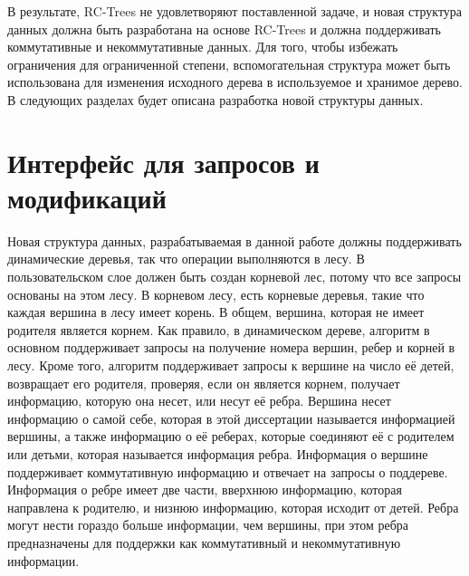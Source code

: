 \documentclass[specification,annotation]{itmo-student-thesis}
\begin{document}
В результате, RC-Trees не удовлетворяют поставленной задаче, и новая структура данных должна быть разработана на основе RC-Trees и должна поддерживать коммутативные и некоммутативные данных. Для того, чтобы избежать 
ограничения для ограниченной степени, вспомогательная структура может быть использована для изменения исходного дерева в используемое и хранимое дерево. В следующих разделах будет описана разработка новой структуры данных.


\section{Интерфейс для запросов и модификаций}


Новая структура данных, разрабатываемая в данной работе должны поддерживать динамические деревья, так что операции выполняются в лесу. В пользовательском слое  должен быть создан корневой лес, потому что все запросы основаны на этом лесу. В корневом лесу, есть корневые деревья, такие что каждая вершина в лесу имеет корень. В общем, вершина, которая не имеет родителя является корнем. Как правило, в динамическом 
дереве, алгоритм в основном поддерживает запросы на получение номера вершин, ребер и корней в лесу. Кроме того, алгоритм поддерживает запросы к вершине на число её детей, возвращает его родителя, проверяя, если он является корнем, получает информацию, которую она несет, или несут её ребра. 
Вершина несет информацию о самой себе, которая в этой диссертации называется информацией вершины, а 
также информацию о её реберах, которые соединяют её с родителем или детьми, которая называется информация ребра. Информация о вершине поддерживает коммутативную информацию и отвечает на запросы о 
поддереве. Информация о ребре имеет две части, вверхнюю информацию, которая направлена к родителю, и низнюю информацию, которая исходит от детей. Ребра могут нести гораздо больше информации, чем 
вершины, при этом ребра предназначены для поддержки как коммутативный и некоммутативную информации.
\end{document}
